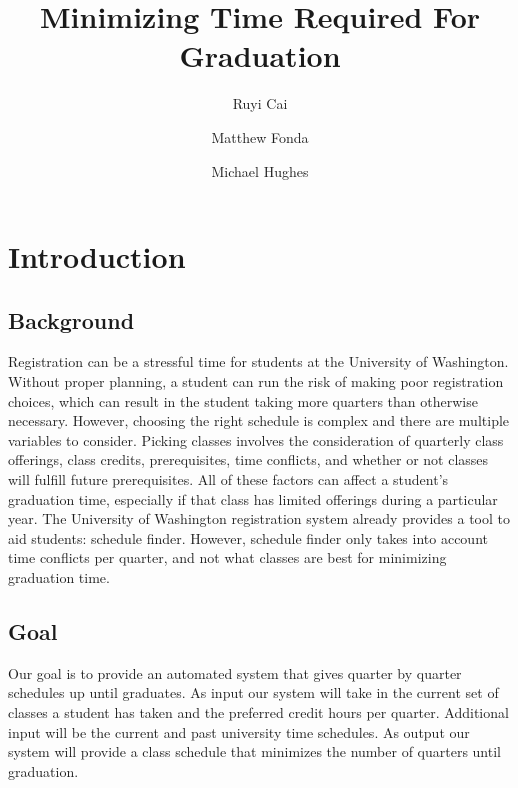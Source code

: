 \documentclass[11pt]{article} %
\title{Minimizing Time Required For Graduation}
\author{Ruyi Cai \and Matthew Fonda \and Michael Hughes}
\begin{document}
\maketitle

\pagebreak


\section{Introduction} \subsection{Background} Registration can be a stressful 
time for students at the University of Washington. Without proper planning, 
a student can run the risk of making poor registration choices, which can 
result in the student taking more quarters than otherwise necessary. However, 
choosing the right schedule is complex and there are multiple variables to 
consider. Picking classes involves the consideration of quarterly class 
offerings, class credits, prerequisites, time conflicts, and whether or not 
classes will fulfill future prerequisites. All of these factors can affect a 
student’s graduation time, especially if that class has limited offerings 
during a particular year. The University of Washington registration system 
already provides a tool to aid students: schedule finder. However, schedule 
finder only takes into account time conflicts per quarter, and not what 
classes are best for minimizing graduation time. 

\subsection{Goal} Our goal is to provide an automated system that gives quarter
by quarter schedules up until graduates. As input our system will take in
the current set of classes a student has taken and the preferred credit hours
per quarter. Additional input will be the current and past university time
schedules. As output our system will provide a class schedule that minimizes the
number of quarters until graduation.
\end{document}
